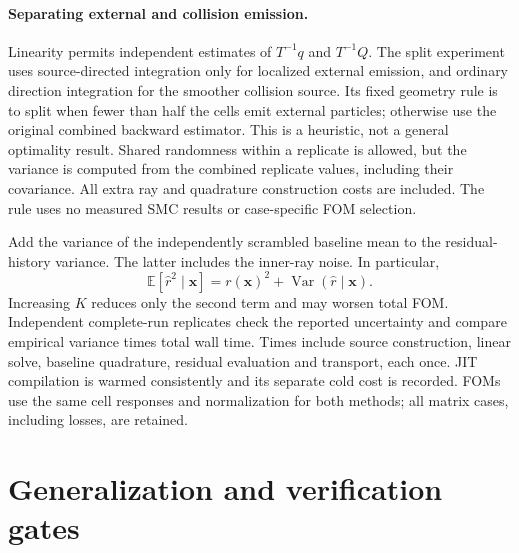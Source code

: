 \documentclass[11pt]{article}
\begin{document}
\paragraph{Separating external and collision emission.}
Linearity permits independent estimates of $T^{-1}q$ and $T^{-1}Q$.
The split experiment uses source-directed integration only for localized external
emission, and ordinary direction integration for the smoother collision source.
Its fixed geometry rule is to split when fewer than half the cells emit external
particles; otherwise use the original combined backward estimator. This is a
heuristic, not a general optimality result. Shared randomness within a replicate
is allowed, but the variance is computed from the combined replicate values,
including their covariance. All extra ray and quadrature construction costs are
included. The rule uses no measured SMC results or case-specific FOM selection.

Add the variance of the independently scrambled baseline mean to the
residual-history variance. The latter includes the inner-ray noise. In particular,
\begin{equation}
 \mathbb E[\widehat r^2\mid\mathbf x]
 =r(\mathbf x)^2+\operatorname{Var}(\widehat r\mid\mathbf x).
\end{equation}
Increasing $K$ reduces only the second term and may worsen total FOM. Independent
complete-run replicates check the reported uncertainty and compare empirical
variance times total wall time. Times include source construction, linear solve,
baseline quadrature, residual evaluation and transport, each once. JIT compilation
is warmed consistently and its separate cold cost is recorded. FOMs use the same
cell responses and normalization for both methods; all matrix cases, including
losses, are retained.

\section{Generalization and verification gates}
\end{document}
